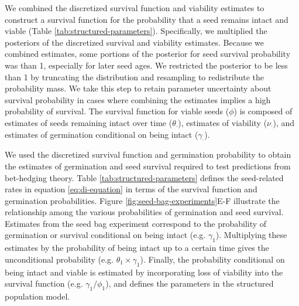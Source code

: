\documentclass[12pt, oneside]{article}   	%
\begin{document}
We combined the discretized survival function and viability estimates to construct a survival function for the probability that a seed remains intact and viable (Table \ref{tab:structured-parameters}). Specifically, we multiplied the posteriors of the discretized survival and viability estimates. Because we combined estimates, some portions of the posterior for seed survival probability was than 1, especially for later seed ages. We restricted the posterior to be less than 1 by truncating the distribution and resampling to redistribute the probability mass. We take this step to retain parameter uncertainty about survival probability in cases where combining the estimates implies a high probability of survival. The survival function for viable seeds ($\phi$) is composed of estimates of seeds remaining intact over time ($\theta_\cdot$), estimates of viability ($\nu_\cdot$), and estimates of germination conditional on being intact ($\gamma_\cdot$).

We used the discretized survival function and germination probability to obtain the estimates of germination and seed survival required to test predictions from bet-hedging theory. Table \ref{tab:structured-parameters} defines the seed-related rates in equation \ref{eq:di-equation} in terms of the survival function and germination probabilities. Figure \ref{fig:seed-bag-experiments}E-F illustrate the relationship among the various probabilities of germination and seed survival. Estimates from the seed bag experiment correspond to the probability of germination or survival conditional on being intact (e.g. $\gamma_1$). Multiplying these estimates by the probability of being intact up to a certain time gives the unconditional probability (e.g. $\theta_1 \times \gamma_1$). Finally, the probability conditional on being intact and viable is estimated by incorporating loss of viability into the survival function (e.g. $\gamma_1 / \phi_1$), and defines the parameters in the structured population model.
\end{document}
